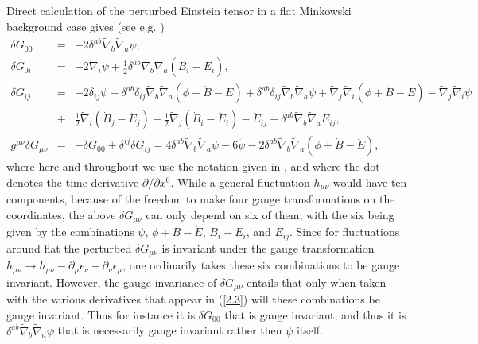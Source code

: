 \documentclass[aps,onecolumn,10pt]{revtex4}
\numberwithin{equation}{section}
\numberwithin{equation}{section}
\begin{document}
Direct calculation of the perturbed Einstein tensor in a flat Minkowski background case gives (see e.g. \cite{Amarasinghe2018})
%
\begin{eqnarray}
\delta G_{00}&=&- 2 \delta^{ab} \tilde{\nabla}_{b}\tilde{\nabla}_{a}\psi,
\nonumber\\
\delta G_{0i}&=&- 2 \tilde{\nabla}_{i}\dot{\psi}+ \tfrac{1}{2} \delta^{ab} \tilde{\nabla}_{b}\tilde{\nabla}_{a}(B_{i} -  \dot{E}_{i}),
\nonumber\\
\delta G_{ij}&=&- 2 \delta_{ij} \ddot{\psi} -  \delta^{ab} \delta_{ij} \tilde{\nabla}_{b}\tilde{\nabla}_{a}(\phi+\dot{B}  -\ddot{E})+ \delta^{ab} \delta_{ij} \tilde{\nabla}_{b}\tilde{\nabla}_{a}\psi 
 + \tilde{\nabla}_{j}\tilde{\nabla}_{i}(\phi+\dot{B} -  \ddot{E})  -  \tilde{\nabla}_{j}\tilde{\nabla}_{i}\psi
\nonumber\\
&+& \tfrac{1}{2} \tilde{\nabla}_{i}(\dot{B}_{j} - \ddot{E}_{j}) + \tfrac{1}{2} \tilde{\nabla}_{j}(\dot{B}_{i}  
- \ddot{E}_{i})- \ddot{E}_{ij} + \delta^{ab} \tilde{\nabla}_{b}\tilde{\nabla}_{a}E_{ij},
\nonumber\\
g^{\mu\nu}\delta G_{\mu\nu}&=&-\delta G_{00}+\delta^{ij}\delta G_{ij}=4 \delta^{ab} \tilde{\nabla}_{b}\tilde{\nabla}_{a}\psi -6\ddot{\psi}-2 \delta^{ab} \tilde{\nabla}_{b}\tilde{\nabla}_{a}(\phi+\dot{B}  -\ddot{E}),
\label{2.3}
\end{eqnarray}
%
where here and throughout we use the notation given in \cite{Weinberg1972}, and where the dot denotes the time derivative $\partial/\partial x^0$. While a general fluctuation $h_{\mu\nu}$ would have ten components, because of the freedom to make four gauge transformations on the coordinates, the above $\delta G_{\mu\nu}$ can only depend on six of them, with the six being given by the combinations $\psi$, $\phi+\dot{B}  -\ddot{E}$, $B_{i} -  \dot{E}_{i}$, and $E_{ij}$. Since for fluctuations around flat the perturbed $\delta G_{\mu\nu}$ is invariant under the gauge transformation $h_{\mu\nu}\rightarrow h_{\mu\nu}-\partial_{\mu}\epsilon_{\nu}-\partial_{\nu}\epsilon_{\mu}$, one ordinarily takes these six combinations to be gauge invariant. However, the gauge invariance of $\delta G_{\mu\nu}$ entails that only when taken with the various derivatives that appear in (\ref{2.3}) will these combinations be gauge invariant. Thus for instance it is $\delta G_{00}$ that is gauge invariant, and thus it is $\delta^{ab} \tilde{\nabla}_{b}\tilde{\nabla}_{a}\psi$ that is necessarily gauge invariant rather then $\psi$ itself. 
\end{document}
